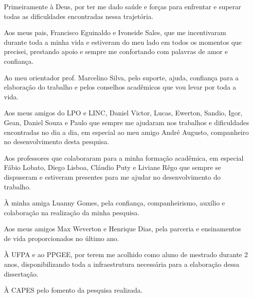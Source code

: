 \begin{agradecimentos}

Primeiramente à Deus, por ter me dado saúde e forças para enfrentar e superar todas as dificuldades encontradas nessa trajetória.

Aos meus pais, Francisco Eguinaldo e Ivoneide Sales, que me incentivaram durante toda a minha vida e estiveram do meu lado em todos os momentos que precisei, prestando apoio e sempre me confortando com palavras de amor e confiança.

Ao meu orientador prof. Marcelino Silva, pelo suporte, ajuda, confiança para a elaboração do trabalho e pelos conselhos acadêmicos que vou levar
por toda a vida.

Aos meus amigos do LPO e LINC, Daniel Victor, Lucas, Ewerton, Sandio, Igor, Gean, Daniel Souza e Paulo que sempre me ajudaram nos trabalhos e dificuldades encontradas no dia a dia, em especial ao meu amigo André Augusto, companheiro no desenvolvimento desta pesquisa.

Aos professores que colaboraram para a minha formação acadêmica, em especial Fábio Lobato, Diego Lisboa, Cláudio Puty e Liviane Rêgo que sempre se dispuseram e estiveram presentes para me ajudar no desenvolvimento do trabalho.

À minha amiga Luanny Gomes, pela confiança, companheirismo, auxílio e colaboração na realização da minha pesquisa.

Aos meus amigos Max Weverton e Henrique Dias, pela parceria e ensinamentos de vida proporcionados no último ano.

À UFPA e ao PPGEE, por terem me acolhido como aluno de mestrado durante 2 anos, disponibilizando toda a infraestrutura necessária para a elaboração dessa dissertação. 

À CAPES pelo fomento da pesquisa realizada.

\end{agradecimentos}
